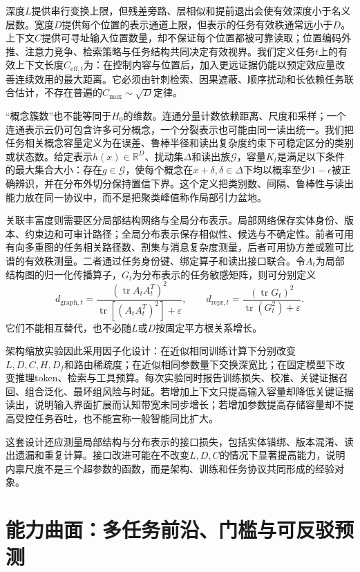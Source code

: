 深度$L$提供串行变换上限，但残差旁路、层相似和提前退出会使有效深度小于名义层数。宽度$D$提供每个位置的表示通道上限，但表示的任务有效秩通常远小于$D$。上下文$C$提供可寻址输入位置数量，却不保证每个位置都被可靠读取；位置编码外推、注意力竞争、检索策略与任务结构共同决定有效视界。我们定义任务$t$上的有效上下文长度$C_{\mathrm{eff},t}$为：在控制内容与位置后，加入更远证据仍能以预定效应量改善连续效用的最大距离。它必须由针刺检索、因果遮蔽、顺序扰动和长依赖任务联合估计，不存在普遍的$C_{\max}\sim\sqrt D$定律。

“概念簇数”也不能等同于$H_0$的维数。连通分量计数依赖距离、尺度和采样；一个连通表示云仍可包含许多可分概念，一个分裂表示也可能由同一读出统一。我们把任务相关概念容量定义为在误差、鲁棒半径和读出复杂度约束下可稳定区分的类别或状态数。给定表示$h(x)\in\mathbb{R}^{D}$、扰动集$\Delta$和读出族$\mathcal{G}$，容量$K_t$是满足以下条件的最大集合大小：存在$g\in\mathcal{G}$，使每个概念在$x+\delta,\delta\in\Delta$下均以概率至少$1-\epsilon$被正确辨识，并在分布外切分保持置信下界。这个定义把类别数、间隔、鲁棒性与读出能力放在同一协议中，而不是把聚类峰值称作局部引力盆地。

关联丰富度则需要区分局部结构网络与全局分布表示。局部网络保存实体身份、版本、约束边和可审计路径；全局分布表示保存相似性、候选与不确定性。前者可用有向多重图的任务相关路径数、割集与消息复杂度测量，后者可用协方差或雅可比谱的有效秩测量。二者通过任务身份键、绑定算子和读出接口联合。令$A_t$为局部结构图的归一化传播算子，$G_t$为分布表示的任务敏感矩阵，则可分别定义
\begin{equation}
d_{\mathrm{graph},t}=\frac{(\operatorname{tr}A_tA_t^T)^2}
{\operatorname{tr}[(A_tA_t^T)^2]+\varepsilon},\qquad
d_{\mathrm{repr},t}=\frac{(\operatorname{tr}G_t)^2}
{\operatorname{tr}(G_t^2)+\varepsilon}.
\end{equation}
它们不能相互替代，也不必随$L$或$D$按固定平方根关系增长。

架构缩放实验因此采用因子化设计：在近似相同训练计算下分别改变$L,D,C,H,D_f$和路由稀疏度；在近似相同参数量下交换深宽比；在固定模型下改变推理token、检索与工具预算。每次实验同时报告训练损失、校准、关键证据召回、组合泛化、最坏组风险与时延。若增加上下文只提高输入容量却降低关键证据读出，说明输入界面扩展而认知带宽未同步增长；若增加参数提高存储容量却不提高受控任务吞吐，也不能宣称一般智能同比扩大。

这套设计还应测量局部结构与分布表示的接口损失，包括实体错绑、版本混淆、读出遗漏和重复计算。接口改进可能在不改变$L,D,C$的情况下显著提高能力，说明内禀尺度不是三个超参数的函数，而是架构、训练和任务协议共同形成的经验对象。

\section{能力曲面：多任务前沿、门槛与可反驳预测}
\label{sec:intrinsic_capacity_equation}

